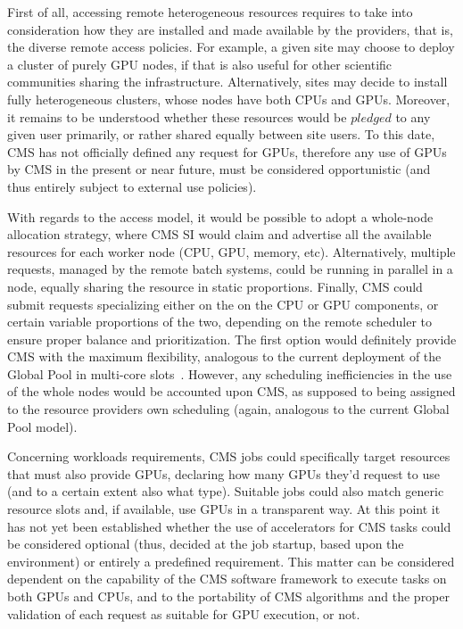 \documentclass{webofc}
\begin{document}
First of all, accessing remote heterogeneous resources requires to take into consideration how they are installed and made available by the providers, that is, the diverse remote access policies. For example, a given site may choose to deploy a cluster of purely GPU nodes, if that is also useful for other scientific communities sharing the infrastructure. Alternatively, sites may decide to install fully heterogeneous clusters, whose nodes have both CPUs and GPUs. Moreover, it remains to be understood whether these resources would be $pledged$ to any given user primarily, or rather shared equally between site users. To this date, CMS has not officially defined any request for GPUs, therefore any use of GPUs by CMS in the present or near future, must be considered opportunistic (and thus entirely subject to external use policies).   

With regards to the access model, it would be possible to adopt a whole-node allocation strategy, where CMS SI would claim and advertise all the available resources for each worker node (CPU, GPU, memory, etc). Alternatively, multiple requests, managed by the remote batch systems, could be running in parallel in a node, equally sharing the resource in static proportions. Finally, CMS could submit requests specializing either on the on the CPU or GPU components, or certain variable proportions of the two, depending on the remote scheduler to ensure proper balance and prioritization. The first option would definitely provide CMS with the maximum flexibility, analogous to the current deployment of the Global Pool in multi-core slots~\cite{multicore}. However, any scheduling inefficiencies in the use of the whole nodes would be accounted upon CMS, as supposed to being assigned to the resource providers own scheduling (again, analogous to the current Global Pool model).

Concerning workloads requirements, CMS jobs could specifically target resources that must also provide GPUs, declaring how many GPUs they'd request to use (and to a certain extent also what type). Suitable jobs could also match generic resource slots and, if available, use GPUs in a transparent way. At this point it has not yet been established whether the use of accelerators for CMS tasks could be considered optional (thus, decided at the job startup, based upon the environment) or entirely a predefined requirement. This matter can be considered dependent on the capability of the CMS software framework to execute tasks on both GPUs and CPUs, and to the portability of CMS algorithms and the proper validation of each request as suitable for GPU execution, or not. 
\end{document}
